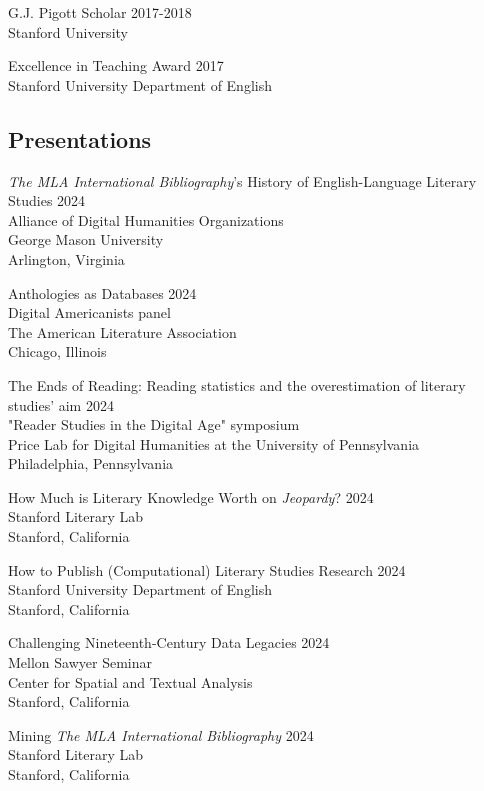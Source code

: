\documentclass[
  12pt,
  letterpaper,
]{article}
\begin{document}
G.J. Pigott Scholar \hfill 2017-2018\\
Stanford University

Excellence in Teaching Award \hfill 2017\\
Stanford University Department of English

\hypertarget{presentations}{%
\subsection{Presentations}\label{presentations}}

\emph{The MLA International Bibliography}’s History of English-Language Literary Studies \hfill 2024\\
Alliance of Digital Humanities Organizations\\
George Mason University\\
Arlington, Virginia 

Anthologies as Databases \hfill 2024\\
Digital Americanists panel\\
The American Literature Association\\
Chicago, Illinois

The Ends of Reading: Reading statistics and the overestimation of literary studies' aim \hfill 2024\\
"Reader Studies in the Digital Age" symposium\\
Price Lab for Digital Humanities at the University of Pennsylvania\\
Philadelphia, Pennsylvania

How Much is Literary Knowledge Worth on \emph{Jeopardy}? \hfill 2024\\
Stanford Literary Lab\\
Stanford, California

How to Publish (Computational) Literary Studies Research \hfill 2024\\
Stanford University Department of English\\
Stanford, California

Challenging Nineteenth-Century Data Legacies \hfill 2024\\
Mellon Sawyer Seminar\\
Center for Spatial and Textual Analysis\\
Stanford, California

Mining \emph{The MLA International Bibliography} \hfill 2024\\
Stanford Literary Lab\\
Stanford, California
\end{document}
